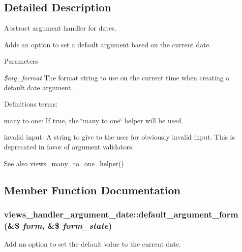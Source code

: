 \subsection{Detailed Description}
Abstract argument handler for dates.

Adds an option to set a default argument based on the current date.


\begin{DoxyParams}{Parameters}
\item[{\em \$arg\_\-format}]The format string to use on the current time when creating a default date argument.\end{DoxyParams}
Definitions terms:
\begin{DoxyItemize}
\item many to one: If true, the \char`\"{}many to one\char`\"{} helper will be used.
\item invalid input: A string to give to the user for obviously invalid input. This is deprecated in favor of argument validators.
\end{DoxyItemize}

\begin{DoxySeeAlso}{See also}
views\_\-many\_\-to\_\-one\_\-helper() 
\end{DoxySeeAlso}


\subsection{Member Function Documentation}
\hypertarget{classviews__handler__argument__date_a9c6775f6c034bfcec9cd0fe0ab0e96f2}{
\subsubsection[{default\_\-argument\_\-form}]{\setlength{\rightskip}{0pt plus 5cm}views\_\-handler\_\-argument\_\-date::default\_\-argument\_\-form (\&\$ {\em form}, \/  \&\$ {\em form\_\-state})}}
\label{classviews__handler__argument__date_a9c6775f6c034bfcec9cd0fe0ab0e96f2}
Add an option to set the default value to the current date. 

